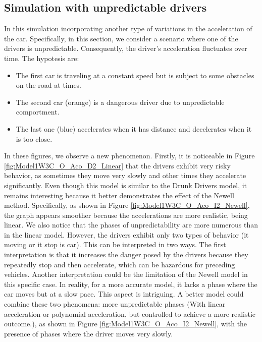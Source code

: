 \documentclass{article}
\begin{document}
		\subsection{Simulation with unpredictable drivers}
		
			In this simulation incorporating another type of variations in the acceleration of the car. Specifically, in this section, we consider a scenario where one of the drivers is unpredictable. Consequently, the driver's acceleration fluctuates over time. The hypotesis are:
			\begin{itemize}
				\item The first car is traveling at a constant speed but is subject to some obstacles on the road at times.
				\item The second car (orange) is a dangerous driver due to unpredictable comportment.
				\item The last one (blue) accelerates when it has distance and decelerates when it is too close.
			\end{itemize}
			
			In these figures, we observe a new phenomenon. Firstly, it is noticeable in Figure \ref{fig:Model1W3C_O_Aco_D2_Linear} that the drivers exhibit very risky behavior, as sometimes they move very slowly and other times they accelerate significantly. Even though this model is similar to the Drunk Drivers model, it remains interesting because it better demonstrates the effect of the Newell method. Specifically, as shown in Figure \ref{fig:Model1W3C_O_Aco_I2_Newell}, the graph appears smoother because the accelerations are more realistic, being linear. We also notice that the phases of unpredictability are more numerous than in the linear model. However, the drivers exhibit only two types of behavior (it moving or it stop is car). This can be interpreted in two ways. The first interpretation is that it increases the danger posed by the drivers because they repeatedly stop and then accelerate, which can be hazardous for preceding vehicles. Another interpretation could be the limitation of the Newell model in this specific case. In reality, for a more accurate model, it lacks a phase where the car moves but at a slow pace. This aspect is intriguing. A better model could combine these two phenomena: more unpredictable phases (With linear acceleration or polynomial acceleration, but controlled to achieve a more realistic outcome.), as shown in Figure \ref{fig:Model1W3C_O_Aco_I2_Newell}, with the presence of phases where the driver moves very slowly.
		
\end{document}
